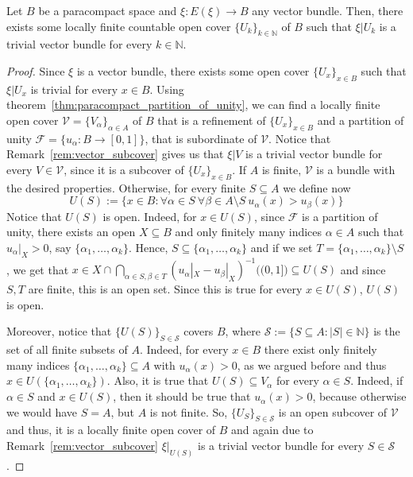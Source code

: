 \begin{lemma}\label{lem:paracompact_countable_cover} Let $B$ be a paracompact space and $\xi:E(\xi)\to B$ any vector bundle. Then, there exists some locally finite countable open cover $\{U_k\}_{k\in\mathbb{N}}$ of $B$ such that $\xi|U_k$ is a trivial vector bundle for every $k\in\mathbb{N}$.
\end{lemma}
\begin{proof} Since $\xi$ is a vector bundle, there exists some open cover $\{U_x\}_{x\in B}$ such that $\xi|U_x$ is trivial for every $x\in B$. Using theorem~\ref{thm:paracompact_partition_of_unity}, we can find a locally finite open cover $\mathcal{V}=\{V_{\alpha}\}_{\alpha\in A}$ of $B$ that is a refinement of $\{U_x\}_{x\in B}$ and a partition of unity $\mathcal{F}=\{u_{\alpha}:B\to[0,1]\}$, that is subordinate of $\mathcal{V}$. Notice that Remark~\ref{rem:vector_subcover} gives us that $\xi|V$ is a trivial vector bundle for every $V\in\mathcal{V}$, since it is a subcover of $\{U_x\}_{x\in B}$. If $A$ is finite, $\mathcal{V}$ is a bundle with the desired properties. Otherwise, for every finite $S\subseteq A$ we define now
\[U(S):=\big\{x\in B: \forall\alpha\in S\ \forall\beta\in A\setminus S\ u_{\alpha}(x)>u_{\beta}(x)\big\}\]
Notice that $U(S)$ is open. Indeed, for $x\in U(S)$, since $\mathcal{F}$ is a partition of unity, there exists an open $X\subseteq B$ and only finitely many indices $\alpha\in A$ such that $u_{\alpha}|_X>0$, say $\{\alpha_1,\ldots,\alpha_k\}$. Hence, $S\subseteq\{\alpha_1,\ldots,\alpha_k\}$ and if we set $T=\{\alpha_1,\ldots,\alpha_k\}\setminus S$, we get that $x\in X\cap\bigcap_{\alpha\in S,\beta\in T}(u_{\alpha}|_X-u_{\beta}|_X)^{-1}\big((0,1]\big)\subseteq U(S)$ and since $S,T$ are finite, this is an open set. Since this is true for every $x\in U(S)$, $U(S)$ is open.

Moreover, notice that $\{U(S)\}_{S\in\mathcal{S}}$ covers $B$, where $\mathcal{S}:=\{S\subseteq A:|S|\in\mathbb{N}\}$ is the set of all finite subsets of $A$. Indeed, for every $x\in B$ there exist only finitely many indices $\{\alpha_1,\ldots,\alpha_k\}\subseteq A$ with $u_{\alpha}(x)>0$, as we argued before and thus $x\in U(\{\alpha_1,\ldots,\alpha_k\})$. Also, it is true that $U(S)\subseteq V_{\alpha}$ for every $\alpha\in S$. Indeed, if $\alpha\in S$ and $x\in U(S)$, then it should be true that $u_{\alpha}(x)>0$, because otherwise we would have $S=A$, but $A$ is not finite. So, $\{U_S\}_{S\in\mathcal{S}}$ is an open subcover of $\mathcal{V}$ and thus, it is a locally finite open cover of $B$ and again due to Remark~\ref{rem:vector_subcover} $\xi|_{U(S)}$ is a trivial vector bundle for every $S\in\mathcal{S}$.


\end{proof}
